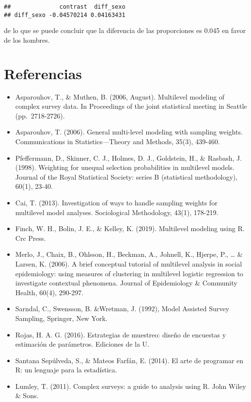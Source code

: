 \documentclass[
  12pt,
]{book}
\begin{document}
\begin{verbatim}
##              contrast  diff_sexo
## diff_sexo -0.04570214 0.04163431
\end{verbatim}

de lo que se puede concluir que la diferencia de las proporciones es 0.045 en favor de los hombres.

\chapter{Referencias}\label{referencias}

\begin{itemize}
\item
  Asparouhov, T., \& Muthen, B. (2006, August). Multilevel modeling of complex survey data. In Proceedings of the joint statistical meeting in Seattle (pp.~2718-2726).
\item
  Asparouhov, T. (2006). General multi-level modeling with sampling weights. Communications in Statistics---Theory and Methods, 35(3), 439-460.
\item
  Pfeffermann, D., Skinner, C. J., Holmes, D. J., Goldstein, H., \& Rasbash, J. (1998). Weighting for unequal selection probabilities in multilevel models. Journal of the Royal Statistical Society: series B (statistical methodology), 60(1), 23-40.
\item
  Cai, T. (2013). Investigation of ways to handle sampling weights for multilevel model analyses. Sociological Methodology, 43(1), 178-219.
\item
  Finch, W. H., Bolin, J. E., \& Kelley, K. (2019). Multilevel modeling using R. Crc Press.
\item
  Merlo, J., Chaix, B., Ohlsson, H., Beckman, A., Johnell, K., Hjerpe, P., \ldots{} \& Larsen, K. (2006). A brief conceptual tutorial of multilevel analysis in social epidemiology: using measures of clustering in multilevel logistic regression to investigate contextual phenomena. Journal of Epidemiology \& Community Health, 60(4), 290-297.
\item
  Sarndal, C., Swensson, B. \&Wretman, J. (1992), Model Assisted Survey Sampling, Springer, New York.
\item
  Rojas, H. A. G. (2016). Estrategias de muestreo: diseño de encuestas y estimación de parámetros. Ediciones de la U.
\item
  Santana Sepúlveda, S., \& Mateos Farfán, E. (2014). El arte de programar en R: un lenguaje para la estadística.
\item
  Lumley, T. (2011). Complex surveys: a guide to analysis using R. John Wiley \& Sons.

\end{itemize}
\end{document}
